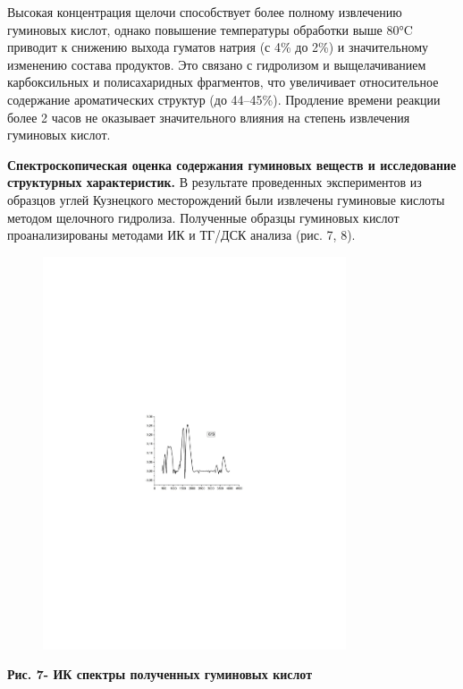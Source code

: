 Высокая концентрация щелочи способствует более полному извлечению
гуминовых кислот, однако повышение температуры обработки выше 80°C
приводит к снижению выхода гуматов натрия (с 4\% до 2\%) и значительному
изменению состава продуктов. Это связано с гидролизом и выщелачиванием
карбоксильных и полисахаридных фрагментов, что увеличивает относительное
содержание ароматических структур (до 44--45\%). Продление времени
реакции более 2 часов не оказывает значительного влияния на степень
извлечения гуминовых кислот.

{\bfseries Спектроскопическая оценка содержания гуминовых веществ и
исследование структурных характеристик.} В результате проведенных
экспериментов из образцов углей Кузнецкого месторождений были извлечены
гуминовые кислоты методом щелочного гидролиза. Полученные образцы
гуминовых кислот проанализированы методами ИК и ТГ/ДСК анализа (рис. 7,
8).

\begin{figure}[H]
	\centering
	\includegraphics[width=0.8\textwidth]{media/gorn3/image18}
	\caption*{}
\end{figure}


{\bfseries Рис. 7- ИК спектры полученных гуминовых кислот}

